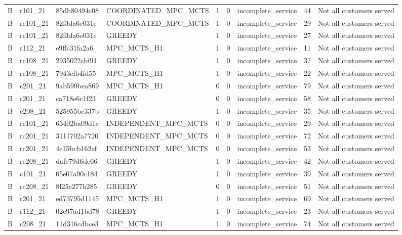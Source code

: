 \begin{table}
{\begin{tabular}{llllrrlrl}
B & r101\_21 & 85db80494c08 & COORDINATED\_MPC\_MCTS & 1 & 0 & incomplete\_service & 44 & Not all customers served \\
B & rc101\_21 & 82f3da6e031c & COORDINATED\_MPC\_MCTS & 1 & 0 & incomplete\_service & 29 & Not all customers served \\
B & rc101\_21 & 82f3da6e031c & GREEDY & 1 & 0 & incomplete\_service & 27 & Not all customers served \\
B & r112\_21 & e9ffc31fa2a6 & MPC\_MCTS\_H1 & 1 & 0 & incomplete\_service & 11 & Not all customers served \\
B & rc108\_21 & 2935022cbf91 & GREEDY & 1 & 0 & incomplete\_service & 37 & Not all customers served \\
B & rc108\_21 & 7943efb4fd55 & MPC\_MCTS\_H1 & 1 & 0 & incomplete\_service & 22 & Not all customers served \\
B & c201\_21 & 9ab599bea869 & MPC\_MCTS\_H1 & 0 & 0 & incomplete\_service & 79 & Not all customers served \\
B & r201\_21 & ca718e6c1f23 & GREEDY & 0 & 0 & incomplete\_service & 58 & Not all customers served \\
B & c208\_21 & 525955bc337b & GREEDY & 1 & 0 & incomplete\_service & 35 & Not all customers served \\
B & rc101\_21 & 63402ba09d1e & INDEPENDENT\_MPC\_MCTS & 0 & 0 & incomplete\_service & 29 & Not all customers served \\
B & rc201\_21 & 3111702a7720 & INDEPENDENT\_MPC\_MCTS & 0 & 0 & incomplete\_service & 72 & Not all customers served \\
B & rc201\_21 & 4e15bcb162ef & INDEPENDENT\_MPC\_MCTS & 0 & 0 & incomplete\_service & 53 & Not all customers served \\
B & rc208\_21 & dafc79d6dc66 & GREEDY & 1 & 0 & incomplete\_service & 42 & Not all customers served \\
B & c101\_21 & 05e07a90c184 & GREEDY & 1 & 0 & incomplete\_service & 39 & Not all customers served \\
B & rc208\_21 & 8f25e277b285 & GREEDY & 0 & 0 & incomplete\_service & 51 & Not all customers served \\
B & r201\_21 & ed73795d1145 & MPC\_MCTS\_H1 & 1 & 0 & incomplete\_service & 69 & Not all customers served \\
B & r112\_21 & 02c97ad1bd78 & GREEDY & 1 & 0 & incomplete\_service & 23 & Not all customers served \\
B & c208\_21 & 11d316cdbce3 & MPC\_MCTS\_H1 & 1 & 0 & incomplete\_service & 74 & Not all customers served \\

\end{tabular}}
\end{table}
